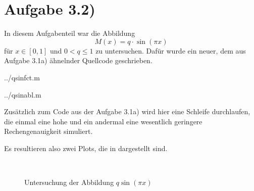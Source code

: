 \section*{Aufgabe 3.2)}
In diesem Aufgabenteil war die Abbildung $$M(x) = q\cdot \sin(πx)$$ für $x\in
[0,1]$ und $0< q \le 1$ zu untersuchen. Dafür wurde ein neuer, dem aus
Aufgabe 3.1a) ähnelnder Quellcode geschrieben.



 {../qsinfct.m}

 {../qsinabl.m}

Zusätzlich zum Code aus der Aufgabe 3.1a) wird hier eine Schleife durchlaufen,
die einmal eine hohe und ein andermal eine wesentlich geringere
Rechengenauigkeit simuliert. 

Es resultieren also zwei Plots, die in  dargestellt sind.

\begin{figure}[htb]%
\begin{center}%
  \\
\caption{Untersuchung der Abbildung $q\sin(πx)$}
\label{fig:qsin}
\end{center}
\end{figure}
